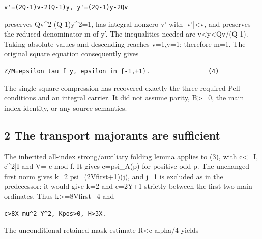 \begin{verbatim}
v'=(2Q-1)v-2(Q-1)y, y'=(2Q-1)y-2Qv
\end{verbatim}

preserves Qv\textasciicircum{}\allowbreak{}2-(Q-1)y\textasciicircum{}\allowbreak{}2=\allowbreak{}1, has integral nonzero v' with |v'|\textless{}\allowbreak{}v, and preserves the reduced denominator m of y'. The inequalities needed are v\textless{}\allowbreak{}y\textless{}\allowbreak{}Qv/\allowbreak{}(Q-1). Taking absolute values and descending reaches v=\allowbreak{}1,y=\allowbreak{}1; therefore m=\allowbreak{}1. The original square equation consequently gives



\begin{verbatim}
Z/M=epsilon tau f y, epsilon in {-1,+1}.                (4)
\end{verbatim}

The single-square compression has recovered exactly the three required Pell conditions and an integral carrier. It did not assume parity, B\textgreater{}\allowbreak{}=\allowbreak{}0, the main index identity, or any source semantics.



\subsection{2 The transport majorants are sufficient}



The inherited all-index strong/\allowbreak{}auxiliary folding lemma applies to (3), with c\textless{}\allowbreak{}=\allowbreak{}I, c\textasciicircum{}\allowbreak{}2|I and V=\allowbreak{}-c mod f. It gives c=\allowbreak{}psi\_\allowbreak{}A(p) for positive odd p. The unchanged first norm gives k=\allowbreak{}2 psi\_\allowbreak{}(2Vfirst+\allowbreak{}1)(j), and j=\allowbreak{}1 is excluded as in the predecessor: it would give k=\allowbreak{}2 and c=\allowbreak{}2Y+\allowbreak{}1 strictly between the first two main ordinates. Thus k\textgreater{}\allowbreak{}=\allowbreak{}8Vfirst+\allowbreak{}4 and



\begin{verbatim}
c>8X mu^2 Y^2, Kpos>0, H>3X.
\end{verbatim}

The unconditional retained mask estimate R\textless{}\allowbreak{}c alpha/\allowbreak{}4 yields



